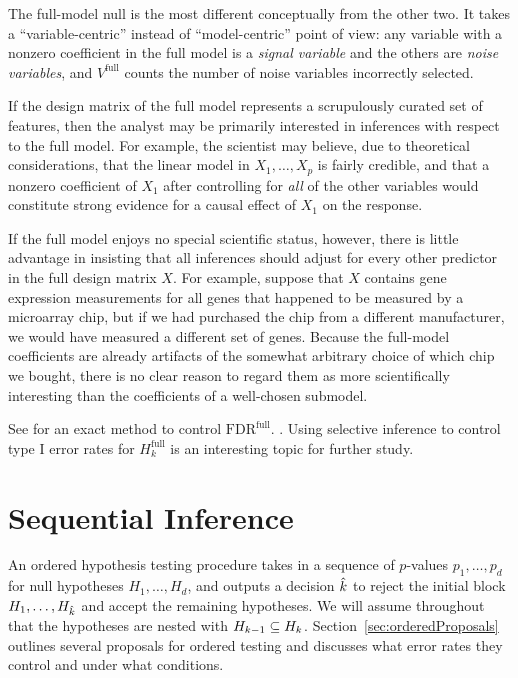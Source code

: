 \documentclass{article}
\begin{document}
The full-model null is the most different conceptually from the other two. It takes a ``variable-centric'' instead of ``model-centric'' point of view: any variable with a nonzero coefficient in the full model is a {\em signal variable} and the others are {\em noise variables}, and $V^{\text{full}}$ counts the number of noise variables incorrectly selected. 

If the design matrix of the full model represents a scrupulously curated set of features, then the analyst may be primarily interested in inferences with respect to the full model. For example, the scientist may believe, due to theoretical considerations, that the linear model in $X_1, \ldots, X_p$ is fairly credible, and that a nonzero coefficient of $X_1$ after controlling for {\em all} of the other variables would constitute strong evidence for a causal effect of $X_1$ on the response. 

If the full model enjoys no special scientific status, however, there is little advantage in insisting that all inferences should adjust for every other predictor in the full design matrix $X$. For example, suppose that $X$ contains gene expression measurements for all genes that happened to be measured by a microarray chip, but if we had purchased the chip from a different manufacturer, we would have measured a different set of genes. Because the full-model coefficients are already artifacts of the somewhat arbitrary choice of which chip we bought, there is no clear reason to regard them as more scientifically interesting than the coefficients of a well-chosen submodel.

See \citet{barber2014controlling} for an exact method to control $\text{FDR}^{\text{full}}$. . Using selective inference to control type I error rates for $H_k^{\text{full}}$ is an interesting topic for further study.

\section{Sequential Inference}\label{sec:sequential}

An ordered hypothesis testing procedure takes in a sequence of $p$-values $p_1, \ldots, p_d$ for null hypotheses $H_{1}, \ldots, H_{d}$, and outputs a decision $\hat{k}$ to reject the initial block $H_{1}, \ldots, H_{\hat{k}}$ and accept the remaining hypotheses. We will assume throughout that the hypotheses are nested with $H_{k-1} \subseteq H_k$. Section~\ref{sec:orderedProposals} outlines several proposals for ordered testing and discusses what error rates they control and under what conditions. 
\end{document}
